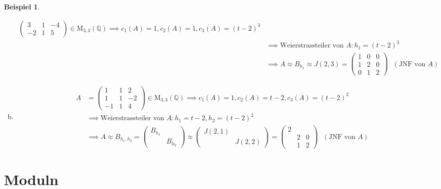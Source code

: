 \documentclass[a4paper, titlepage]{article}
\theoremstyle{definition}
\newtheorem{bsp}[satz]{Beispiel}
\newcommand{\Q}{\mathbb{Q}}
\newcommand{\M}{\mathrm{M}}
\begin{document}
\begin{bsp}
\begin{enumerate}[(a)]
\begin{align*}
\begin{pmatrix}
                3 & 1 & -4 \\
                -2 & 1 & 5
            \end{pmatrix}\in \M_{3,3}(\Q)\implies c_1(A)=1,c_2(A)=1,c_3(A)=(t-2)^3\\
            &\implies \text{Weierstrassteiler von }A: h_1=(t-2)^3\\
            &\implies A\approx B_{h_1}\approx J(2,3)=\begin{pmatrix}
                1 & 0 & 0\\
                1 & 2 & 0\\
                0 & 1 & 2 
            \end{pmatrix}\text{  } (\text{JNF von } A)
        \end{align*}
        \item \begin{align*}
        A&=\begin{pmatrix}
            1 & 1 & 2\\
            1 & 1 & -2 \\
            -1 & 1 & 4
        \end{pmatrix}\in\M_{3,3}(\Q)\implies c_1(A)=1,c_2(A)=t-2,c_3(A)=(t-2)^2\\
        &\implies \text{Weierstrassteiler von }A: h_1=t-2,h_2=(t-2)^2\\
        &\implies A\approx B_{h_1,h_2}=\begin{pmatrix}
            B_{h_1}&\\
            &B_{h_2}
        \end{pmatrix}\approx \begin{pmatrix}
            J(2,1)&\\
            & J(2,2)
        \end{pmatrix}=\begin{pmatrix}
            2 & & \\
            & 2 & 0\\
            & 1 & 2 
        \end{pmatrix}\text{  } (\text{JNF von }A)
    \end{align*}
        \end{enumerate}
        \end{bsp}
        \part{Moduln}
\end{document}
